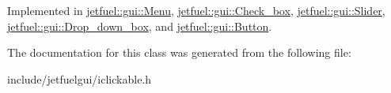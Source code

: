 Implemented in \hyperlink{classjetfuel_1_1gui_1_1Menu_a17298e1cec290db84ab4e3b1b13bd614}{jetfuel\+::gui\+::\+Menu}, \hyperlink{classjetfuel_1_1gui_1_1Check__box_a0e50420591dbd64f07f02f9ee7cec637}{jetfuel\+::gui\+::\+Check\+\_\+box}, \hyperlink{classjetfuel_1_1gui_1_1Slider_a8a1e83cfea8d65db34da7447dce9fb6f}{jetfuel\+::gui\+::\+Slider}, \hyperlink{classjetfuel_1_1gui_1_1Drop__down__box_ae3607405b7e3fe981da75f0529e0a7a1}{jetfuel\+::gui\+::\+Drop\+\_\+down\+\_\+box}, and \hyperlink{classjetfuel_1_1gui_1_1Button_ab80239583f2e515370a90771976c5265}{jetfuel\+::gui\+::\+Button}.



The documentation for this class was generated from the following file\+:\begin{DoxyCompactItemize}
\item 
include/jetfuelgui/iclickable.\+h\end{DoxyCompactItemize}
